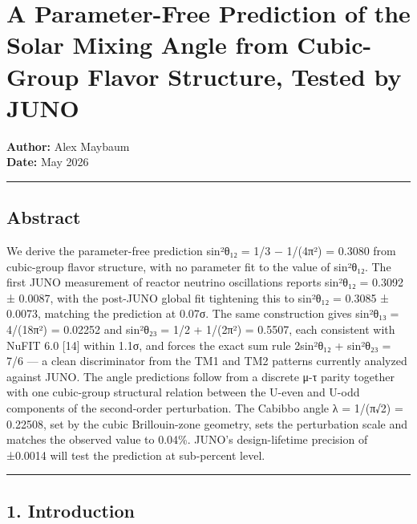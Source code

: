 \documentclass[
  11pt,
  letterpaper,
]{article}
\author{}
\date{}
\begin{document}
\hypertarget{a-parameter-free-prediction-of-the-solar-mixing-angle-from-cubic-group-flavor-structure-tested-by-juno}{%
\section{A Parameter-Free Prediction of the Solar Mixing Angle from
Cubic-Group Flavor Structure, Tested by
JUNO}\label{a-parameter-free-prediction-of-the-solar-mixing-angle-from-cubic-group-flavor-structure-tested-by-juno}}

\textbf{Author:} Alex Maybaum\\
\textbf{Date:} May 2026

\begin{center}\rule{0.5\linewidth}{0.5pt}\end{center}

\hypertarget{abstract}{%
\subsection{Abstract}\label{abstract}}

We derive the parameter-free prediction sin²θ₁₂ = 1/3 − 1/(4π²) = 0.3080
from cubic-group flavor structure, with no parameter fit to the value of
sin²θ₁₂. The first JUNO measurement of reactor neutrino oscillations
reports sin²θ₁₂ = 0.3092 ± 0.0087, with the post-JUNO global fit
tightening this to sin²θ₁₂ = 0.3085 ± 0.0073, matching the prediction at
0.07σ. The same construction gives sin²θ₁₃ = 4/(18π²) = 0.02252 and
sin²θ₂₃ = 1/2 + 1/(2π²) = 0.5507, each consistent with NuFIT 6.0
{[}14{]} within 1.1σ, and forces the exact sum rule 2sin²θ₁₂ + sin²θ₂₃ =
7/6 --- a clean discriminator from the TM1 and TM2 patterns currently
analyzed against JUNO. The angle predictions follow from a discrete μ-τ
parity together with one cubic-group structural relation between the
U-even and U-odd components of the second-order perturbation. The
Cabibbo angle λ = 1/(π√2) = 0.22508, set by the cubic Brillouin-zone
geometry, sets the perturbation scale and matches the observed value to
0.04\%. JUNO's design-lifetime precision of ±0.0014 will test the
prediction at sub-percent level.

\begin{center}\rule{0.5\linewidth}{0.5pt}\end{center}

\hypertarget{introduction}{%
\subsection{1. Introduction}\label{introduction}}
\end{document}
